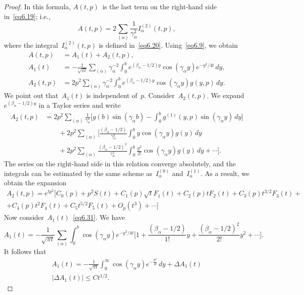 \documentclass{amsart}
\theoremstyle{plain}
\theoremstyle{definition}
\numberwithin{equation}{section}
\begin{document}
\begin{proof}
In this formula, $A(t,p)$~is the last term on the right-hand side
in~\eqref{eq6.19}; i.e.,
$$
A(t,p)=2\sum_{(\alpha)}\frac{1}{\gamma_\alpha^2}I_\alpha^{(2)}(t,p),
$$
where the integral~$I_\alpha^{(2)}(t,p)$ is defined
in~\eqref{eq6.20}. Using~\eqref{eq6.9}, we obtain
\begin{align}
\label{eq6.30}
A(t,p)&=A_1(t)+A_2(t,p),
\\
\label{eq6.31}
A_1(t)&=-\frac{1}{\sqrt{\pi t}}\sum_{(\alpha)}\gamma_\alpha^{-2}
\int_0^b e^{(\beta_\alpha-1/2)y}\cos(\gamma_\alpha y)e^{-y^2/4t}\,dy,
\\
\label{eq6.32}
A_2(t,p)&=2p^2\sum_{(\alpha)}\gamma_\alpha^{-2}\int_0^b
e^{(\beta_\alpha-1/2)y}\cos(\gamma_\alpha y)g(y,p)\,dy.
\end{align}
We point out that~$A_1(t)$ is independent of~$p$.
Consider~$A_2(t,p)$. We expand~$e^{(\beta_\alpha-1/2)y}$ in a
Taylor series and write
\begin{align*}
A_2(t,p)&=2p^2\sum_{(\alpha)}\frac{1}{\gamma_\alpha^{3}}\biggl[g(b)
\sin(\gamma_\alpha b)-\int_0^b g^{(1)}(y,p)\sin(\gamma_\alpha y)\,dy\biggr]
\\
&\qquad+2p^2\sum_{(\alpha)}\biggl[\frac{(\beta_\alpha-1/2)}{\gamma_\alpha^{2}}
\int_0^by\cos(\gamma_\alpha y) g(y)\,dy
\\
&\qquad+2p^2\sum_{(\alpha)}
\frac{(\beta_\alpha-1/2)^2}{\gamma_\alpha^{2}}\int_0^b \frac{y^2}{2!}
\cos(\gamma_\alpha y) g(y)\,dy+\cdots\biggr].
\end{align*}
The series on the right-hand side in this relation converge
absolutely, and the integrals can be estimated by the same scheme
as~$I_\alpha^{(0)}$ and~$I_\alpha^{(1)}$. As a result, we obtain
the expansion
\begin{multline}\label{eq6.33}
A_2(t,p)=e^{tp^2}[C_0(p)+p^{2}S(t) +C_{1}(p)\sqrt{t}F_{1}(t)+C_{2}(p)tF_{2}(t)+C_{3}(p)t^{3/2}F_{3}(t)+\\
+C_{4}(p)t^{2}F_{4}(t)+C_{5}t^{5/2}F_{5}(t)+O_{p}(t^{3})+\cdots]
\end{multline}
Now consider~$A_1(t)$~\eqref{eq6.31}. We have
$$
A_1(t)=-\frac{1}{\sqrt{\pi t}}\sum_{(\alpha)}\int_0^b\cos(\gamma_\alpha y)
e^{-y^2/4t}\biggl[1+\frac{(\beta_\alpha-1/2)}{1!}y+
\frac{(\beta_\alpha-1/2)^2}{2!}y^2+\cdots\biggr].
$$
It follows that
\begin{gather}
\label{eq6.34}
A_1(t)=-\frac{1}{\sqrt{\pi t}}\int_0^\infty\cos(\gamma_\alpha y)
e^{-\frac{y^2}{4t}}\,dy+\Delta A_1(t)
\\
\label{eq6.35}
|\Delta A_1(t)|\leqslant Ct^{1/2}.
\end{gather}


\end{proof}
\end{document}
